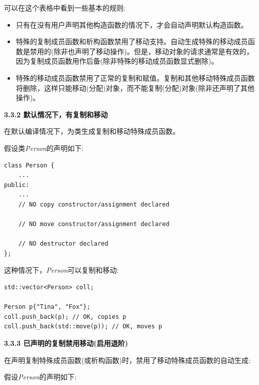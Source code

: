 可以在这个表格中看到一些基本的规则:\par

\begin{itemize}
	\item 只有在没有用户声明其他构造函数的情况下，才会自动声明默认构造函数。
	\item 特殊的复制成员函数和析构函数禁用了移动支持。自动生成特殊的移动成员函数是禁用的(除非也声明了移动操作)。但是，移动对象的请求通常是有效的，因为复制成员函数用作后备(除非特殊的移动成员函数显式删除)。
	\item 特殊的移动成员函数禁用了正常的复制和赋值。复制和其他移动特殊成员函数将删除，这样只能移动(分配)对象，而不能复制(分配)对象(除非还声明了其他操作)。
\end{itemize}

\hspace*{\fill} \par %
\textbf{3.3.2 默认情况下，有复制和移动}

在默认编译情况下，为类生成复制和移动特殊成员函数。\par

假设类\textit{Person}的声明如下:\par

\begin{lstlisting}[caption={}]
class Person {
	...
public:
	...
	// NO copy constructor/assignment declared
	
	// NO move constructor/assignment declared
	
	// NO destructor declared
};
\end{lstlisting}

这种情况下，\textit{Person}可以复制和移动:\par

\begin{lstlisting}[caption={}]
std::vector<Person> coll;

Person p{"Tina", "Fox"};
coll.push_back(p); // OK, copies p
coll.push_back(std::move(p)); // OK, moves p
\end{lstlisting}

\hspace*{\fill} \par %
\textbf{3.3.3 已声明的复制禁用移动(启用退阶)}

在声明复制特殊成员函数(或析构函数)时，禁用了移动特殊成员函数的自动生成:\par

假设\textit{Person}的声明如下:\par

